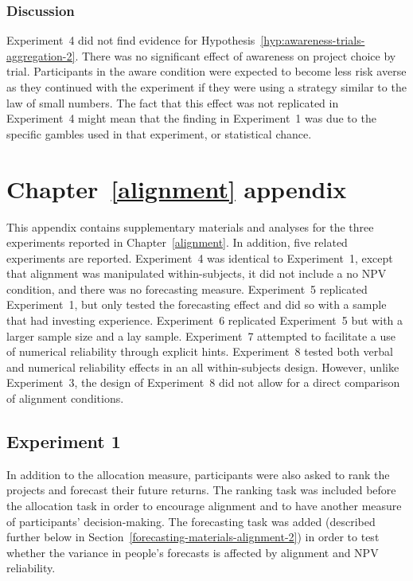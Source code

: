 \documentclass[a4paper, nobind, dvipsnames]{templates/ociamthesis}
\theoremstyle{definition}
\theoremstyle{definition}
\theoremstyle{definition}
\theoremstyle{definition}
\theoremstyle{remark}
\begin{document}
\subsection{Discussion}

Experiment~4 did not find evidence for
Hypothesis~\ref{hyp:awareness-trials-aggregation-2}. There was no significant
effect of awareness on project choice by trial. Participants in the aware
condition were expected to become less risk averse as they continued with the
experiment if they were using a strategy similar to the law of small numbers.
The fact that this effect was not replicated in Experiment~4 might mean that the
finding in Experiment~1 was due to the specific gambles used in that experiment,
or statistical chance.

\hypertarget{alignment-appendix}{%
\chapter{Chapter~\ref{alignment} appendix}\label{alignment-appendix}}

\minitoc

This appendix contains supplementary materials and analyses for the three
experiments reported in Chapter~\ref{alignment}. In addition, five related
experiments are reported. Experiment~4 was identical to Experiment~1, except
that alignment was manipulated within-subjects, it did not include a no NPV
condition, and there was no forecasting measure. Experiment~5 replicated
Experiment~1, but only tested the forecasting effect and did so with a sample
that had investing experience. Experiment~6 replicated Experiment~5 but with a
larger sample size and a lay sample. Experiment~7 attempted to facilitate a use
of numerical reliability through explicit hints. Experiment~8 tested both verbal
and numerical reliability effects in an all within-subjects design. However,
unlike Experiment~3, the design of Experiment~8 did not allow for a direct
comparison of alignment conditions.

\hypertarget{alignment-2-appendix}{%
\section{Experiment 1}\label{alignment-2-appendix}}

In addition to the allocation measure, participants were also asked to rank the
projects and forecast their future returns. The ranking task was included before
the allocation task in order to encourage alignment and to have another measure
of participants' decision-making. The forecasting task was added (described
further below in Section~\ref{forecasting-materials-alignment-2}) in order to
test whether the variance in people's forecasts is affected by alignment and NPV
reliability.
\end{document}
